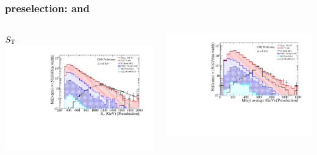 \documentclass[bigger]{beamer}
\begin{document}
\begin{frame}
\frametitle{\eejj preselection: \ST and \mej}
\label{sec-2-1-2}
\begin{columns}
\begin{column}{0.6\textwidth}
\label{sec-2-1-2-1}

\centering
$S_{\text{T}}$
\includegraphics[width=\textwidth]{fig/ee/preselection_noRatio/sT_PAS_eejj.pdf}
\end{column}
\begin{column}{0.6\textwidth}
\label{sec-2-1-2-2}

\centering
\mej
\includegraphics[width=\textwidth]{fig/ee/preselection_noRatio/Mej_selected_avg_PAS_eejj.pdf}
\end{column}
\end{columns}
\end{frame}
\end{document}
